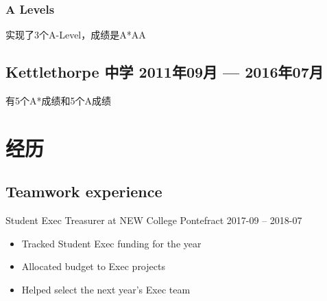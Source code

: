 \documentclass[10pt]{extarticle}
\begin{document}
            \subsubsection{A Levels}
            实现了3个A-Level，成绩是A*AA %
            \begin{comment}
                \begin{tabular}{cccc}
                    \textbf{Subject} & \textbf{Exam Board} & \textbf{AS/A2} &
                    \textbf{Grade}\\
                    Mathematics & AQA & A2 & A* \\
                    Further Mathematics & AQA & A2 & A \\
                    Computer Science & OCR & A2 & A \\
                    Physics & AQA & AS & A
                \end{tabular}
            \end{comment}
        \subsection{Kettlethorpe 中学 %
            \hfill 2011年09月 --- 2016年07月}
            有5个A*成绩和5个A成绩
\section{经历} %
    \subsection{Teamwork experience}
        Student Exec Treasurer at NEW College Pontefract
        \hfill 2017-09 -- 2018-07\par
        \begin{itemize}
            \item Tracked Student Exec funding for the year
            \item Allocated budget to Exec projects
            \item Helped select the next year's Exec team
        \end{itemize}
\end{document}
